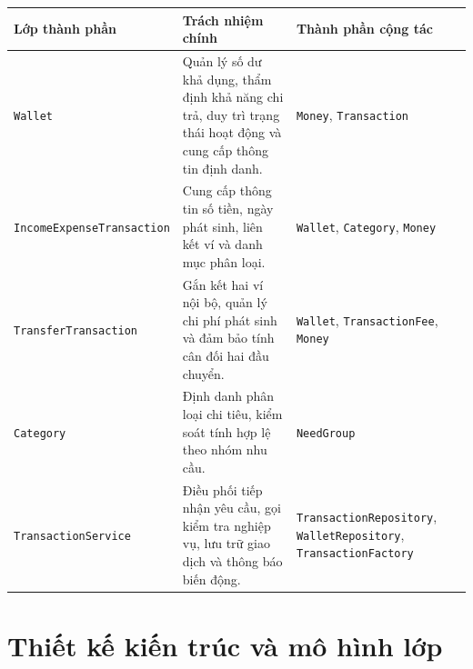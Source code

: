 \documentclass[a4paper,12pt]{report}
\newcommand{\passthrough}[1]{#1}
\newcounter{none}
\begin{document}
{\def\LTcaptype{none} %
\begin{longtable}[]{@{}
  >{\raggedright\arraybackslash}p{}
  >{\raggedright\arraybackslash}p{}
  >{\raggedright\arraybackslash}p{}@{}}
\toprule\noalign{}
\begin{minipage}[b]{\linewidth}\raggedright
Lớp thành phần
\end{minipage} & \begin{minipage}[b]{\linewidth}\raggedright
Trách nhiệm chính
\end{minipage} & \begin{minipage}[b]{\linewidth}\raggedright
Thành phần cộng tác
\end{minipage} \\
\midrule\noalign{}
\endhead
\bottomrule\noalign{}
\endlastfoot
\passthrough{\lstinline!Wallet!} & Quản lý số dư khả dụng, thẩm định khả
năng chi trả, duy trì trạng thái hoạt động và cung cấp thông tin định
danh. & \passthrough{\lstinline!Money!},
\passthrough{\lstinline!Transaction!} \\
\passthrough{\lstinline!IncomeExpenseTransaction!} & Cung cấp thông tin
số tiền, ngày phát sinh, liên kết ví và danh mục phân loại. &
\passthrough{\lstinline!Wallet!}, \passthrough{\lstinline!Category!},
\passthrough{\lstinline!Money!} \\
\passthrough{\lstinline!TransferTransaction!} & Gắn kết hai ví nội bộ,
quản lý chi phí phát sinh và đảm bảo tính cân đối hai đầu chuyển. &
\passthrough{\lstinline!Wallet!},
\passthrough{\lstinline!TransactionFee!},
\passthrough{\lstinline!Money!} \\
\passthrough{\lstinline!Category!} & Định danh phân loại chi tiêu, kiểm
soát tính hợp lệ theo nhóm nhu cầu. &
\passthrough{\lstinline!NeedGroup!} \\
\passthrough{\lstinline!TransactionService!} & Điều phối tiếp nhận yêu
cầu, gọi kiểm tra nghiệp vụ, lưu trữ giao dịch và thông báo biến động. &
\passthrough{\lstinline!TransactionRepository!},
\passthrough{\lstinline!WalletRepository!},
\passthrough{\lstinline!TransactionFactory!} \\
\end{longtable}
}

\chapter{Thiết kế kiến trúc và mô hình
lớp}\label{thiux1ebft-kux1ebf-kiux1ebfn-truxfac-vuxe0-muxf4-huxecnh-lux1edbp}
\end{document}
